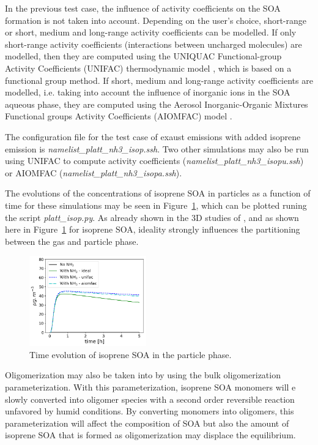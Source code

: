 \documentclass[a4paper,11pt]{article}
\begin{document}
In the previous test case, the influence of activity coefficients on the SOA formation is not taken into account. 
Depending on the user's choice, short-range or short, medium and long-range activity coefficients can be modelled. If only short-range activity coefficients (interactions between uncharged molecules) are modelled, then they are computed using the UNIQUAC Functional-group Activity Coefficients (UNIFAC) thermodynamic model \cite{Fredenslund}, 
which is based on a functional group method. If short, medium and long-range activity coefficients are modelled, i.e. taking into account the influence of inorganic ions in the SOA aqueous phase, they are computed using the Aerosol Inorganic-Organic Mixtures Functional groups Activity Coefficients (AIOMFAC) model \cite{zuend2008}. 

The configuration file for the test case of exaust emissions with added isoprene emission is {\it{namelist\_platt\_nh3\_isop.ssh}}.
Two other simulations may also be run using UNIFAC to compute activity coefficients ({\it{namelist\_platt\_nh3\_isopu.ssh}}) or AIOMFAC ({\it{namelist\_platt\_nh3\_isopa.ssh}}).

The evolutions of the concentrations of isoprene SOA in particles as a function of time for these simulations may be seen in Figure~\ref{fig-platt-isop}, which can be plotted runing the script {\it{platt\_isop.py}}.
As already shown in the 3D studies of \cite{couvidat2012, kim2019}, and as shown here in Figure~\ref{fig-platt-isop} for isoprene SOA, ideality strongly influences the partitioning between the gas and particle phase. 
\begin{figure}[H]
        \begin{center}
                \includegraphics[angle=0,width=0.45\textwidth]{../graph/figure_ref/platt-isop.png}
        \end{center}
	\caption{Time evolution of isoprene SOA in the particle phase.}
\label{fig-platt-isop}
\end{figure}

Oligomerization may also be taken into by using the bulk oligomerization parameterization. With this parameterization, isoprene SOA monomers will e slowly converted into oligomer species with a second order reversible reaction unfavored by humid conditions. By converting monomers into oligomers, this parameterization will affect the composition of SOA but also the amount of isoprene SOA that is formed as oligomerization may displace the equilibrium.
\end{document}
